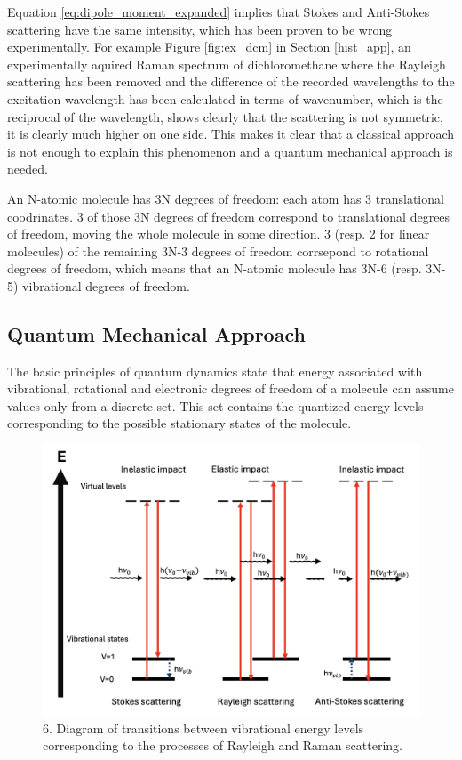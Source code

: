 \bigskip

Equation \ref{eq:dipole_moment_expanded} implies that Stokes and Anti-Stokes scattering have the same intensity, which has been proven to be wrong experimentally. For example Figure \ref{fig:ex_dcm} in Section \ref{hist_app}, an experimentally aquired Raman spectrum of dichloromethane where the Rayleigh scattering has been removed and the difference of the recorded wavelengths to the excitation wavelength has been calculated in terms of wavenumber, which is the reciprocal of the wavelength, shows clearly that the scattering is not symmetric, it is clearly much higher on one side. This makes it clear that a  classical approach is not enough to explain this phenomenon and a quantum mechanical approach is needed. \cite{theory1} \cite{presentation}

\bigskip

An N-atomic molecule has 3N degrees of freedom: each atom has 3 translational coodrinates. 3 of those 3N degrees of freedom correspond to translational degrees of freedom, moving the whole molecule in some direction. 3 (resp. 2 for linear molecules) of the remaining 3N-3 degrees of freedom corrsepond to rotational degrees of freedom, which means that an N-atomic molecule has 3N-6 (resp. 3N-5) vibrational degrees of freedom. \cite{molecularvibration}

\newpage

\subsection{Quantum Mechanical Approach}

The basic principles of quantum dynamics state that energy associated with vibrational, rotational and electronic degrees of freedom of a molecule can assume values only from a discrete set. This set contains the quantized energy levels corresponding to the possible stationary states of the molecule.

\begin{figure}[h]
    \includegraphics[width=\textwidth]{images/theory/qm_scattering.png}
    \caption{6. Diagram of transitions between vibrational energy levels corresponding to the processes of Rayleigh and Raman scattering.}
    \label{fig:energy_model}
\end{figure}

